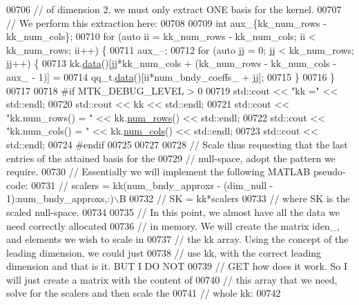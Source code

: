 \begin{DoxyCode}
{{00706   \textcolor{comment}{// of dimension 2, we must only extract ONE basis for the kernel.}
00707   \textcolor{comment}{// We perform this extraction here:}
00708 
00709   \textcolor{keywordtype}{int} aux\_\{kk\_num\_rows - kk\_num\_cols\};
00710   \textcolor{keywordflow}{for} (\textcolor{keyword}{auto} ii = kk\_num\_rows - kk\_num\_cols; ii < kk\_num\_rows; ii++) \{
00711     aux\_--;
00712     \textcolor{keywordflow}{for} (\textcolor{keyword}{auto} jj = 0; jj < kk\_num\_rows; jj++) \{
00713       kk.\hyperlink{classmtk_1_1DenseMatrix_a0c33b8a9e01d157c61ddbdf807c25d84}{data}()[jj*kk\_num\_cols + (kk\_num\_rows - kk\_num\_cols - aux\_ - 1)] =
00714         qq\_t.\hyperlink{classmtk_1_1DenseMatrix_a0c33b8a9e01d157c61ddbdf807c25d84}{data}()[ii*num\_bndy\_coeffs\_ + jj];
00715     \}
00716   \}
00717 
00718 \textcolor{preprocessor}{  #if MTK\_DEBUG\_LEVEL > 0}
00719   std::cout << \textcolor{stringliteral}{"kk ="} << std::endl;
00720   std::cout << kk << std::endl;
00721   std::cout << \textcolor{stringliteral}{"kk.num\_rows() = "} << kk.\hyperlink{classmtk_1_1DenseMatrix_a53f3afb3b6a8d21854458aaa9663cc74}{num\_rows}() << std::endl;
00722   std::cout << \textcolor{stringliteral}{"kk.num\_cols() = "} << kk.\hyperlink{classmtk_1_1DenseMatrix_a41747502d468c6728a4be31501b16e0e}{num\_cols}() << std::endl;
00723   std::cout << std::endl;
00724 \textcolor{preprocessor}{  #endif}
00725 
00727 
00728   \textcolor{comment}{// Scale thus requesting that the last entries of the attained basis for the}
00729   \textcolor{comment}{// null-space, adopt the pattern we require.}
00730   \textcolor{comment}{// Essentially we will implement the following MATLAB pseudo-code:}
00731   \textcolor{comment}{//  scalers = kk(num\_bndy\_approxs - (dim\_null - 1):num\_bndy\_approxs,:)\(\backslash\)B}
00732   \textcolor{comment}{//  SK = kk*scalers}
00733   \textcolor{comment}{// where SK is the scaled null-space.}
00734 
00735   \textcolor{comment}{// In this point, we almost have all the data we need correctly allocated}
00736   \textcolor{comment}{// in memory. We will create the matrix iden\_, and elements we wish to scale in}
00737   \textcolor{comment}{// the kk array. Using the concept of the leading dimension, we could just}
00738   \textcolor{comment}{// use kk, with the correct leading dimension and that is it. BUT I DO NOT}
00739   \textcolor{comment}{// GET how does it work. So I will just create a matrix with the content of}
00740   \textcolor{comment}{// this array that we need, solve for the scalers and then scale the}
00741   \textcolor{comment}{// whole kk:}
00742 
}}
\end{DoxyCode}
